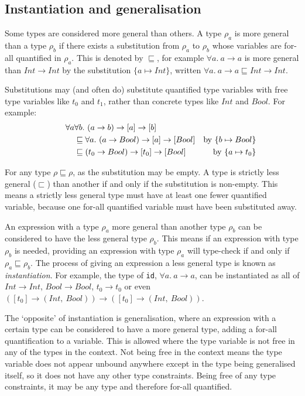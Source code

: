 \documentclass[a4paper,fleqn,oneside,12pt]{report}
\begin{document}
\subsection{Instantiation and generalisation}

Some types are considered more general than others. A type $\rho_a$ is more general than a type $\rho_b$ if there exists a substitution from $\rho_a$ to $\rho_b$ whose variables are for-all quantified in $\rho_a$. This is denoted by $\sqsubseteq$, for example $\forall a.\ a \rightarrow a$ is more general than $Int \rightarrow Int$ by the substitution $\{ a \mapsto Int \}$, written $\forall a.\ a \rightarrow a \sqsubseteq Int \rightarrow Int$.

Substitutions may (and often do) substitute quantified type variables with free type variables like $t_0$ and $t_1$, rather than concrete types like $Int$ and $Bool$. For example:
\begin{align*}
\hspace{0.75cm}\forall a & \forall b.\ (a \rightarrow b) \rightarrow [a] \rightarrow [b]
\\& \sqsubseteq \forall a.\ (a \rightarrow Bool) \rightarrow [a] \rightarrow [Bool] &\textrm{by}\ \{ b \mapsto Bool \}
\\&\sqsubseteq (t_0 \rightarrow Bool) \rightarrow [t_0] \rightarrow [Bool] &\textrm{by}\ \{ a \mapsto t_0 \}
\end{align*}

For any type $\rho \sqsubseteq \rho$, as the substitution may be empty. A type is strictly less general ($\sqsubset$) than another if and only if the substitution is non-empty. This means a strictly less general type must have at least one fewer quantified variable, because one for-all quantified variable must have been substituted away.

An expression with a type $\rho_a$ more general than another type $\rho_b$ can be considered to have the less general type $\rho_b$. This means if an expression with type $\rho_b$ is needed, providing an expression with type $\rho_a$ will type-check if and only if $\rho_a \sqsubseteq \rho_b$. The process of giving an expression a less general type is known as \textit{instantiation}. For example, the type of \texttt{id}, $\forall a.\ a \rightarrow a$, can be instantiated as all of $Int \rightarrow Int$, $Bool \rightarrow Bool$, $t_0 \rightarrow t_0$ or even $([t_0] \rightarrow (Int,\ Bool)) \rightarrow ([t_0] \rightarrow (Int,\ Bool))$.

The `opposite' of instantiation is generalisation, where an expression with a certain type can be considered to have a more general type, adding a for-all quantification to a variable. This is allowed where the type variable is not free in any of the types in the context. Not being free in the context means the type variable does not appear unbound anywhere except in the type being generalised itself, so it does not have any other type constraints. Being free of any type constraints, it may be any type and therefore for-all quantified.
\end{document}
